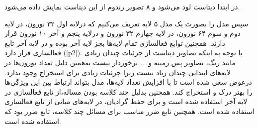 \documentclass[12pt]{article}
\begin{document}
	در ابتدا دیتاست  لود می‌شود و ۸ تصویر رندوم از این دیتاست نمایش داده می‌شود.
	\begin{figure}[H]
		\centering
		\quad
	\end{figure}
	سپس مدل را بصورت یک مدل ۵ لایه تعریف می‌کنیم که درلابه اول ۳۲ نورون، در لایه دوم و سوم ۶۴ نورون، در لایه چهارم ۳۲ نورون و درلایه پنجم و آخر ۱۰ نورون قرار دارند. همچنین توابع فعالسازی تمام لایه‌ها بجز لایه آخر  بوده و در لایه آخر تابع فعالسازی  قرار دارد (\ref{p2}). با توجه به اینکه تصاویر دیتاست از جزئیات چندان زیادی مانند رنگ، تصاویر پس زمینه و ... برخوردار نیست به‌همین دلیل تعداد نورون‌ها در لایه‌های ابتدایی چندان زیاد نیست زیرا جزئیات زیادی برای استخراج وجود ندارد. درعوض سعی شده است تا با افزایش تعداد لایه‌ها، مدل بتواند ارتباط بین این ویژگی‌ها را بهتر درک و استخراج کند. همچنین بدلیل چند کلاسه بودن مساله،‌از تابع فعالسازی  در لایه آخر استفاده شده است و برای حفظ گرادیان، در لایه‌های میانی از تابع فعالسازی  استفاده شده است. همچنین تابع ضرر مناسب برای مسائل چند کلاسه، تابع ضرر  بود که استفاده شده است.
\end{document}
